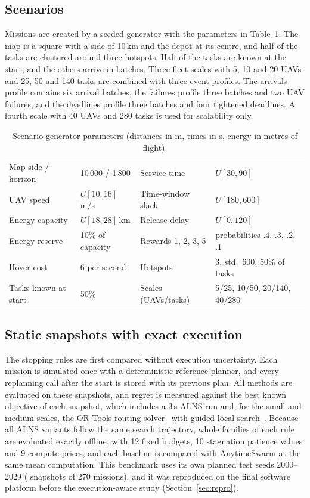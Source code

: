 \subsection{Scenarios}
Missions are created by a seeded generator with the parameters in Table~\ref{tab:params}. The map is a square with a
side of 10\,km and the depot at its centre, and half of the tasks are clustered around three hotspots. Half of the tasks
are known at the start, and the others arrive in batches. Three fleet scales with 5, 10 and 20 UAVs and 25, 50 and 140
tasks are combined with three event profiles. The arrivals profile contains six arrival batches, the failures profile
three batches and two UAV failures, and the deadlines profile three batches and four tightened deadlines. A fourth scale
with 40 UAVs and 280 tasks is used for scalability only.

\begin{table}[t]
\caption{Scenario generator parameters (distances in m, times in s, energy in metres of flight).}\label{tab:params}
\centering\small
\setlength{\tabcolsep}{4pt}
\begin{tabular}{ll@{\qquad}ll}
\toprule
Map side / horizon & 10\,000 / 1\,800 & Service time & $U[30,90]$ \\
UAV speed & $U[10,16]$\,m/s & Time-window slack & $U[180,600]$ \\
Energy capacity & $U[18,28]$\,km & Release delay & $U[0,120]$ \\
Energy reserve & 10\% of capacity & Rewards 1, 2, 3, 5 & probabilities .4, .3, .2, .1 \\
Hover cost & 6 per second & Hotspots & 3, std.\ 600, 50\% of tasks \\
Tasks known at start & 50\% & Scales (UAVs/tasks) & 5/25, 10/50, 20/140, 40/280 \\
\bottomrule
\end{tabular}
\end{table}

\subsection{Static snapshots with exact execution}
The stopping rules are first compared without execution uncertainty. Each mission is simulated once with a
deterministic reference planner, and every replanning call after the start is stored with its previous plan. All
methods are evaluated on these snapshots, and regret is measured against the best known objective of each snapshot,
which includes a 3\,s ALNS run and, for the small and medium scales, the OR-Tools routing solver~\cite{ortools} with
guided local search~\cite{voudouris1999gls}. Because all ALNS variants follow the same search trajectory, whole families
of each rule are evaluated exactly offline, with 12 fixed budgets, 10 stagnation patience values and 9 compute prices,
and each baseline is compared with AnytimeSwarm at the same mean computation. This benchmark uses its own planned
test seeds 2000--2029 ( snapshots of 270 missions), and it was reproduced on the final software platform
before the execution-aware study (Section~\ref{sec:repro}).

